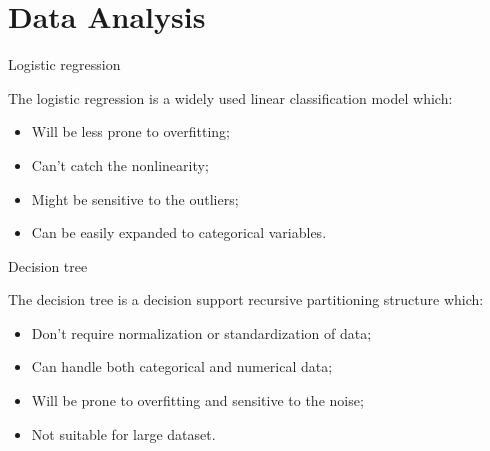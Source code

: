 \documentclass{beamer}
\begin{document}
\section{Data Analysis}

\begin{frame}{Logistic regression}

  The logistic regression is a widely used linear classification model which: \vspace{.25cm}

  \begin{itemize}
    \item Will be less prone to overfitting; \vspace{.25cm}
    \item Can't catch the nonlinearity; \vspace{.25cm}
    \item Might be sensitive to the outliers; \vspace{.25cm}
    \item Can be easily expanded to categorical variables. \vspace{.25cm}
  \end{itemize}

\end{frame}

\begin{frame}{Decision tree}

  The decision tree is a decision support recursive partitioning structure which: \vspace{.25cm}

  \begin{itemize}
    \item Don't require normalization or standardization of data; \vspace{.25cm}
    \item Can handle both categorical and numerical data; \vspace{.25cm}
    \item Will be prone to overfitting and sensitive to the noise; \vspace{.25cm}
    \item Not suitable for large dataset. \vspace{.25cm}
  \end{itemize}

\end{frame}
\end{document}
